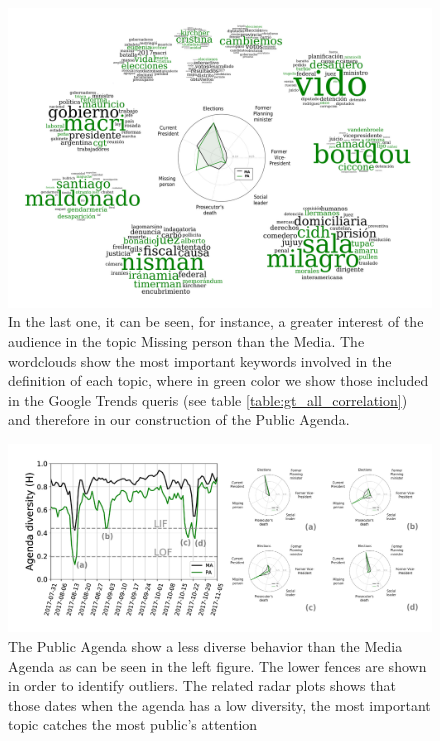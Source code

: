 \documentclass{bmcart}
\begin{document}
\begin{backmatter}
\begin{figure}[h!]
\centering
\includegraphics[width = \textwidth]{images/Fig2.pdf}
\caption{
In the last one, it can be seen, for instance, a greater interest of the audience in the topic Missing person than the Media.
The wordclouds show the most important keywords involved in the definition of each topic, where in green color we show those included in the Google Trends queris (see table \ref{table:gt_all_correlation}) and therefore in our construction of the Public Agenda.
}
\label{fig:topics_wordclouds}
\end{figure}

\begin{figure}[h!]
\includegraphics[width = \textwidth]{images/Fig3.pdf}
\caption{ The Public Agenda show a less diverse behavior than the Media Agenda as can be seen in the left figure. The lower fences are shown in order to identify outliers. The related radar plots shows that those dates when the agenda has a low diversity, the most important topic catches the most public’s attention}
\label{fig:shannon_entropy_agendas}
\end{figure}


\end{backmatter}
\end{document}
